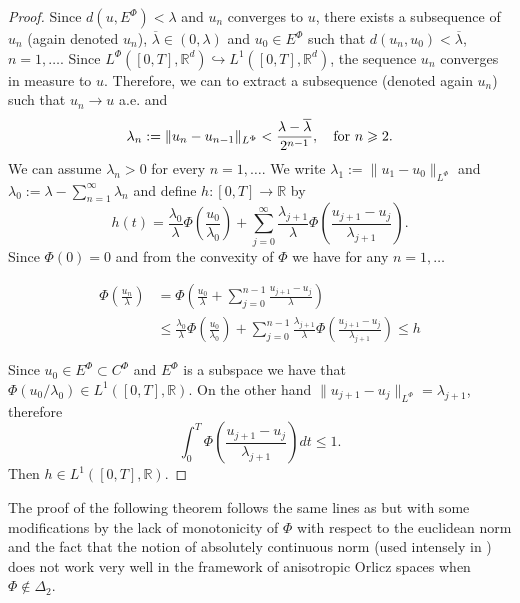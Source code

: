 \documentclass[twoside]{article}
\theoremstyle{remark}
\newcommand{\orlnor}{\|_{L^{\Phi}}}
\newcommand{\lphi}{L^{\Phi}}
\newcommand{\ephi}{E^{\Phi}}
\newcommand{\claseor}{C^{\Phi}}
\newcommand{\rr}{\mathbb{R}}
\renewcommand{\leq}{\leqslant}
\renewcommand{\geq}{\geqslant}
\begin{document}
\begin{proof}
  Since $d({u},\ephi)<\lambda$ and ${u}_n$ converges to ${u}$, there exists   a subsequence of $u_n$ (again denoted $u_n$), $\overline{\lambda}\in (0,\lambda)$ and $u_0\in\ephi$ such that $d(u_n,u_0)<\overline{\lambda}$, $n=1,\ldots$. Since $\lphi\left([0,T],\rr^d\right)\hookrightarrow L^1\left([0,T],\rr^d\right)$, the sequence $u_n$ converges in measure to $u$. Therefore, we can to extract a subsequence (denoted again $u_n$) such that $u_n\to u$ a.e. and
  \[\lambda_{n}:=\|{u}_{n}-{u}_{n-1}\orlnor<\frac{\lambda-\overline{\lambda}}{2^{n-1}},\quad\hbox{for } n\geq 2.\]
 We can assume $\lambda_n>0$ for every $n=1,\ldots$. We write $\lambda_1:=\|u_1-u_0\orlnor$ and  $\lambda_0:=\lambda-\sum_{n=1}^{\infty}\lambda_n$ and define $h:[0,T]\rightarrow\mathbb{R}$  by
 \begin{equation}\label{eq:serie} h(t)=  \frac{\lambda_0}{\lambda}\Phi\left(\frac{u_0}{\lambda_0}\right)+\sum_{j=0}^{\infty}\frac{\lambda_{j+1}}{\lambda}\Phi\left(\frac{u_{j+1}-u_j}{\lambda_{j+1}}\right).
\end{equation}
 Since $\Phi(0)=0$ and from the convexity of $\Phi$ we have for any $n=1,\ldots$


\[
 \begin{split}
   \Phi\left(\frac{u_n}{\lambda}\right) &=\Phi\left(  \frac{u_0}{\lambda}+   \sum_{j=0}^{n-1}\frac{u_{j+1}-u_j}{\lambda} \right)\\
   &\leq
   \frac{\lambda_0}{\lambda}\Phi\left(\frac{u_0}{\lambda_0}\right)+\sum_{j=0}^{n-1}\frac{\lambda_{j+1}}{\lambda}\Phi\left(\frac{u_{j+1}-u_j}{\lambda_{j+1}}\right) \leq h
 \end{split}
\]

Since $u_0\in\ephi\subset \claseor$ and $\ephi$ is a subspace we have that $\Phi(u_0/\lambda_0)\in L^1([0,T],\rr)$.
On the other hand $\|u_{j+1}-u_j\orlnor = \lambda_{j+1}$, therefore
\[
\int_0^T\Phi\left(\frac{u_{j+1}-u_j}{\lambda_{j+1}}\right)dt\leq 1.
\]
Then $h\in L^1([0,T],\rr)$.



\end{proof}





The  proof of the following theorem follows the same lines as \cite[Thm. 3.2]{ABGMS2015} but with some modifications by the lack of monotonicity of $\Phi$ with  respect to the euclidean norm and the fact that  the notion of absolutely continuous norm (used intensely in \cite[Thm. 3.2]{ABGMS2015}) does not work very well in the framework of anisotropic Orlicz spaces when $\Phi \notin \Delta_2$.
\end{document}
